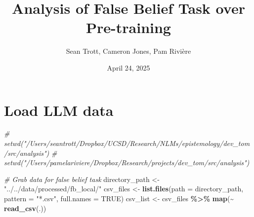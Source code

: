 \documentclass[
]{article}
\title{Analysis of False Belief Task over Pre-training}
\author{Sean Trott, Cameron Jones, Pam Rivière}
\date{April 24, 2025}
\newenvironment{Shaded}{\begin{snugshade}}{\end{snugshade}}
\newcommand{\AttributeTok}[1]{\textcolor[rgb]{0.13,0.29,0.53}{#1}}
\newcommand{\CommentTok}[1]{\textcolor[rgb]{0.56,0.35,0.01}{\textit{#1}}}
\newcommand{\ConstantTok}[1]{\textcolor[rgb]{0.56,0.35,0.01}{#1}}
\newcommand{\FunctionTok}[1]{\textcolor[rgb]{0.13,0.29,0.53}{\textbf{#1}}}
\newcommand{\NormalTok}[1]{#1}
\newcommand{\OtherTok}[1]{\textcolor[rgb]{0.56,0.35,0.01}{#1}}
\newcommand{\SpecialCharTok}[1]{\textcolor[rgb]{0.81,0.36,0.00}{\textbf{#1}}}
\newcommand{\StringTok}[1]{\textcolor[rgb]{0.31,0.60,0.02}{#1}}
\begin{document}
\maketitle

\hypertarget{load-llm-data}{%
\section{Load LLM data}\label{load-llm-data}}

\begin{Shaded}
\begin{Highlighting}[]
\CommentTok{\# setwd("/Users/seantrott/Dropbox/UCSD/Research/NLMs/epistemology/dev\_tom/src/analysis")}
\CommentTok{\# setwd("/Users/pamelariviere/Dropbox/Research/projects/dev\_tom/src/analysis")}

\CommentTok{\# Grab data for false belief task}
\NormalTok{directory\_path }\OtherTok{\textless{}{-}} \StringTok{"../../data/processed/fb\_local/"}
\NormalTok{csv\_files }\OtherTok{\textless{}{-}} \FunctionTok{list.files}\NormalTok{(}\AttributeTok{path =}\NormalTok{ directory\_path, }\AttributeTok{pattern =} \StringTok{"*.csv"}\NormalTok{, }\AttributeTok{full.names =} \ConstantTok{TRUE}\NormalTok{)}
\NormalTok{csv\_list }\OtherTok{\textless{}{-}}\NormalTok{ csv\_files }\SpecialCharTok{\%\textgreater{}\%}
  \FunctionTok{map}\NormalTok{(}\SpecialCharTok{\textasciitilde{}} \FunctionTok{read\_csv}\NormalTok{(.))}
\end{Highlighting}
\end{Shaded}
\end{document}
